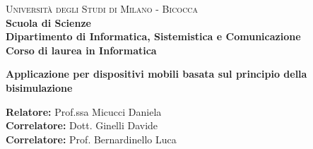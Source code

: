 \documentclass[a4paper,11pt,twoside,openright]{report}
\begin{document}
    
    \begin{titlepage}
        
        \noindent
        \begin{minipage}[t]{0.19\textwidth}
        \end{minipage}
        \begin{minipage}[t]{0.81\textwidth}
        {
                {\textsc{Università degli Studi di Milano - Bicocca}} \\
                \textbf{Scuola di Scienze} \\
                \textbf{Dipartimento di Informatica, Sistemistica e Comunicazione} \\
                \textbf{Corso di laurea in Informatica} \\
                \par
        }
        \end{minipage}
        
	\vspace{40mm}
        
	\begin{center}
            {\LARGE{
                    \textbf{Applicazione per dispositivi mobili basata sul principio della bisimulazione}
                    \par
            }}
        \end{center}
        
        \vspace{50mm}

        \noindent
        {\large \textbf{Relatore:} Prof.ssa Micucci Daniela} \\

        \noindent
        {\large \textbf{Correlatore:} Dott. Ginelli Davide}\\
        {\large \textbf{Correlatore:} Prof. Bernardinello Luca}	
        
        \vspace{15mm}


\end{titlepage}
\end{document}

